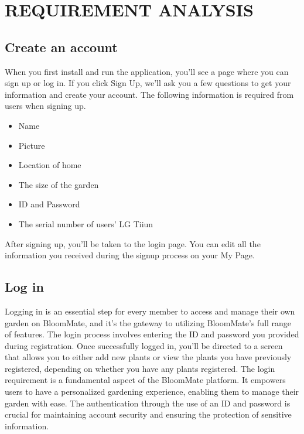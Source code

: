\documentclass[conference, a4paper]{IEEEtran}
\begin{document}
\section{REQUIREMENT ANALYSIS}
\subsection{Create an account}
When you first install and run the application, you'll see a page where you can sign up or log in. If you click Sign Up, we'll ask you a few questions to get your information and create your account. The following information is required from users when signing up.
\begin{itemize}
    \item Name
    \item Picture
    \item Location of home
    \item The size of the garden
    \item ID and Password
    \item The serial number of users' LG Tiiun
\end{itemize}
After signing up, you’ll be taken to the login page. You can edit all the information you received during the signup process on your My Page.\\
\subsection{Log in}
Logging in is an essential step for every member to access and manage their own garden on BloomMate, and it's the gateway to utilizing BloomMate's full range of features. The login process involves entering the ID and password you provided during registration. Once successfully logged in, you'll be directed to a screen that allows you to either add new plants or view the plants you have previously registered, depending on whether you have any plants registered. The login requirement is a fundamental aspect of the BloomMate platform. It empowers users to have a personalized gardening experience, enabling them to manage their garden with ease. The authentication through the use of an ID and password is crucial for maintaining account security and ensuring the protection of sensitive information. \\
\end{document}
